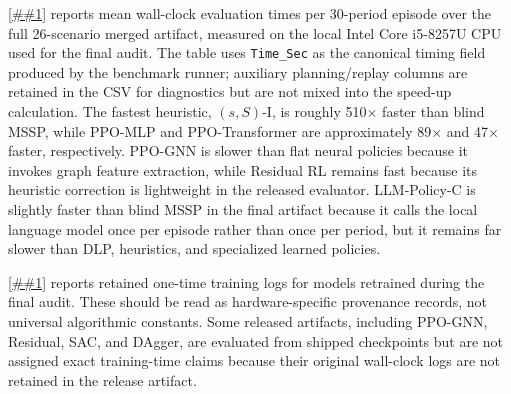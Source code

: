\documentclass[10pt,a4paper]{article}
\providecommand{\Cref}[1]{\ref{##1}}
\begin{document}
\Cref{tab:compute_times} reports mean wall-clock evaluation times
per 30-period episode over the full 26-scenario merged artifact,
measured on the local Intel Core i5-8257U CPU used for the final audit.
The table uses
\texttt{Time\_Sec} as the canonical timing field produced by the
benchmark runner; auxiliary planning/replay columns are retained in the
CSV for diagnostics but are not mixed into the speed-up calculation.
The fastest heuristic, $(s,S)$-I, is roughly 510$\times$ faster than
blind MSSP, while PPO-MLP and PPO-Transformer are approximately
89$\times$ and 47$\times$ faster, respectively. PPO-GNN is slower than
flat neural policies because it invokes graph feature extraction, while
Residual RL remains fast because its heuristic correction is lightweight
in the released evaluator. LLM-Policy-C is slightly faster than blind
MSSP in the final artifact because it calls the local language model
once per episode rather than once per period, but it remains far slower
than DLP, heuristics, and specialized learned policies.

\Cref{tab:training_times} reports retained one-time training logs for
models retrained during the final audit. These should be read as
hardware-specific provenance records, not universal algorithmic
constants. Some released artifacts, including PPO-GNN, Residual, SAC, and
DAgger, are evaluated from shipped checkpoints but are not assigned exact
training-time claims because their original wall-clock logs are not
retained in the release artifact.
\end{document}
